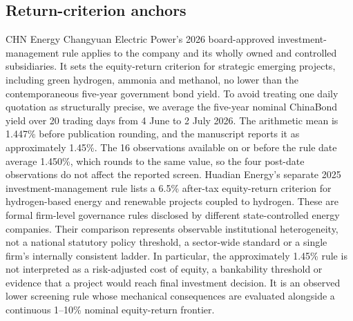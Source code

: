 \documentclass[11pt,a4paper]{article}
\begin{document}
\subsection{Return-criterion anchors}

CHN Energy Changyuan Electric Power's 2026 board-approved investment-management rule applies to the company and its wholly owned and controlled subsidiaries. It sets the equity-return criterion for strategic emerging projects, including green hydrogen, ammonia and methanol, no lower than the contemporaneous five-year government bond yield\cite{changyuan2026}. To avoid treating one daily quotation as structurally precise, we average the five-year nominal ChinaBond yield over 20 trading days from 4 June to 2 July 2026. The arithmetic mean is 1.447\% before publication rounding, and the manuscript reports it as approximately 1.45\%\cite{chinabond2026}. The 16 observations available on or before the rule date average 1.450\%, which rounds to the same value, so the four post-date observations do not affect the reported screen. Huadian Energy's separate 2025 investment-management rule lists a 6.5\% after-tax equity-return criterion for hydrogen-based energy and renewable projects coupled to hydrogen\cite{huadian2025}. These are formal firm-level governance rules disclosed by different state-controlled energy companies. Their comparison represents observable institutional heterogeneity, not a national statutory policy threshold, a sector-wide standard or a single firm's internally consistent ladder. In particular, the approximately 1.45\% rule is not interpreted as a risk-adjusted cost of equity, a bankability threshold or evidence that a project would reach final investment decision. It is an observed lower screening rule whose mechanical consequences are evaluated alongside a continuous 1--10\% nominal equity-return frontier.
\end{document}
